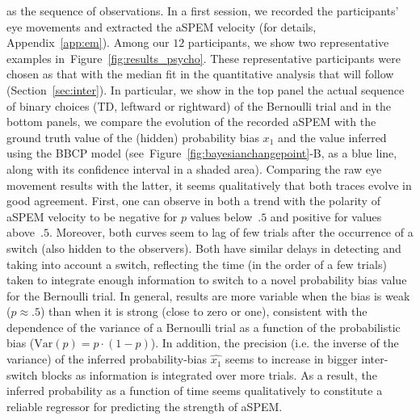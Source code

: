 \documentclass[12pt,english]{article}%
\newcommand{\seeFig}[1]{Figure~\ref{fig:#1}}
\newcommand{\seeApp}[1]{Appendix~\ref{app:#1}}
\newcommand{\seeSec}[1]{Section~\ref{sec:#1}}
\begin{document}
as the sequence of observations.
In a first session, we recorded the participants' eye movements and 
extracted the aSPEM velocity (for details, \seeApp{em}).
Among our $12$ participants,
we show two representative examples in~\seeFig{results_psycho}.
These representative participants were chosen as that
with the median fit in the quantitative analysis
that will follow (\seeSec{inter}).
In particular, we show in the top panel the actual sequence of binary choices
(TD, leftward or rightward) of the Bernoulli trial  and 
in the bottom panels, we compare the evolution of the recorded aSPEM with
the ground truth value of the (hidden) probability bias $x_1$
and the value inferred using the BBCP model (see~\seeFig{bayesianchangepoint}-B,
as a blue line, along with its confidence interval in a shaded area).
Comparing the raw eye movement results with the latter,
it seems qualitatively that both traces evolve in good agreement.
First, one can observe in both a trend with the polarity of aSPEM velocity
to be negative for $p$ values below~$.5$ and positive for values above~$.5$.
Moreover, both curves seem to lag of few trials 
after the occurrence of a switch
(also hidden to the observers).
Both have similar delays in detecting and taking into account a switch,
reflecting the time (in the order of a few trials) taken to integrate enough information
to switch to a novel probability bias value for the Bernoulli trial.
In general, results are more variable when the bias is weak ($p\approx .5$)
than when it is strong (close to zero or one),
consistent with the dependence of the variance of a Bernoulli trial
as a function of the probabilistic bias ($\textrm{Var}(p)= p \cdot (1-p)$).
In addition, the precision (i.e. the inverse of the variance)
of the inferred probability-bias $\hat{x_1}$ seems to increase
in bigger inter-switch blocks as information is integrated over more trials.
As a result, the inferred probability as a function of time
seems qualitatively to constitute a reliable regressor
for predicting the strength of aSPEM.
\end{document}
